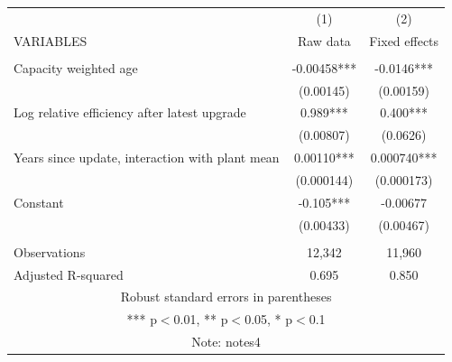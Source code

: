 \scriptsize
\begin{tabular}{lcc} \hline
 & (1) & (2) \\
VARIABLES & Raw data & Fixed effects \\ \hline
 &  &  \\
Capacity weighted age & -0.00458*** & -0.0146*** \\
 & (0.00145) & (0.00159) \\
Log relative efficiency after latest upgrade & 0.989*** & 0.400*** \\
 & (0.00807) & (0.0626) \\
Years since update, interaction with plant mean & 0.00110*** & 0.000740*** \\
 & (0.000144) & (0.000173) \\
Constant & -0.105*** & -0.00677 \\
 & (0.00433) & (0.00467) \\
 &  &  \\
Observations & 12,342 & 11,960 \\
 Adjusted R-squared & 0.695 & 0.850 \\ \hline
\multicolumn{3}{c}{ Robust standard errors in parentheses} \\
\multicolumn{3}{c}{ *** p$<$0.01, ** p$<$0.05, * p$<$0.1} \\
\multicolumn{3}{c}{ Note: notes4} \\
\end{tabular}
